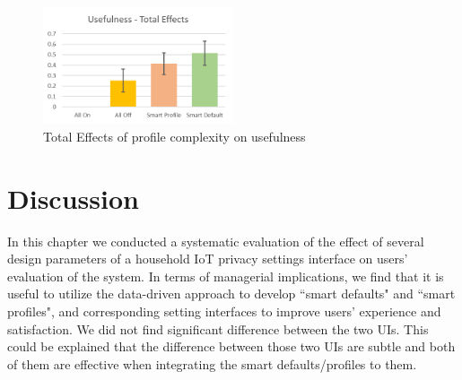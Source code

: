 \begin{figure}
	\centering
	\includegraphics[width=0.5\textwidth]{figures/effectonusefulness.png}
	\caption{Total Effects of profile complexity on usefulness}
	\label{fig:effectonusefulness}
\end{figure}





\section{Discussion}
In this chapter we conducted a systematic evaluation of the effect of several design parameters of a household IoT privacy settings interface on users’ evaluation of the system. In terms of managerial implications, we find that it is useful to utilize the data-driven approach to develop ``smart defaults" and ``smart profiles", and corresponding setting interfaces to improve users' experience and satisfaction. We did not find significant difference between the two UIs. This could be explained that the difference between those two UIs are subtle and both of them are effective when integrating the smart defaults/profiles to them.

